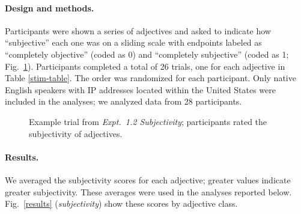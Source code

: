 \documentclass[12pt]{article}
\begin{document}
\paragraph{Design and methods.} Participants were shown a series of adjectives and asked to indicate how ``subjective'' each one was on a sliding scale with endpoints labeled as ``completely objective'' (coded as 0) and ``completely subjective'' (coded as 1; Fig.~\ref{subjectivity-trial}). 
Participants completed a total of 26 trials, one for each adjective in Table \ref{stim-table}. The order was randomized for each participant. Only native English speakers with IP addresses located within the United States were included in the analyses; we analyzed data from 28 participants.

\begin{figure}[tbh]
	\centering
	\caption{Example trial from \emph{Expt.\ 1.2 Subjectivity}; participants rated the subjectivity of adjectives.}\label{subjectivity-trial}
\end{figure}

\paragraph{Results.} We averaged the subjectivity scores for each adjective; greater values indicate greater subjectivity. These averages were used in the analyses reported below. Fig.\ \ref{results} (\emph{subjectivity}) show these scores by adjective class.
\end{document}
